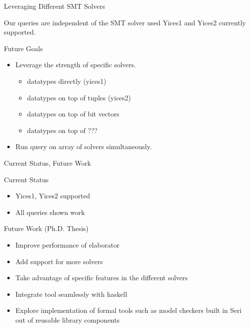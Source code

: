 \documentclass{beamer}
\begin{document}
\begin{frame}{Leveraging Different SMT Solvers}
\begin{block}{Our queries are independent of the SMT solver used}
Yices1 and Yices2 currently supported.
\end{block}
\begin{block}{Future Goals}
    \begin{itemize}
        \item Leverage the strength of specific solvers.
        \begin{itemize}
            \item datatypes directly (yices1)
            \item datatypes on top of tuples (yices2)
            \item datatypes on top of bit vectors
            \item datatypes on top of ???
        \end{itemize}

        \item Run query on array of solvers simultaneously.
    \end{itemize}
\end{block}
\end{frame}

\begin{frame}{Current Status, Future Work}
\begin{block}{Current Status}
    \begin{itemize}
        \item Yices1, Yices2 supported
        \item All queries shown work
    \end{itemize}
\end{block}
\begin{block}{Future Work (Ph.D. Thesis)}
    \begin{itemize}
        \item Improve performance of elaborator
        \item Add support for more solvers
        \item Take advantage of specific features in the different solvers
        \item Integrate tool seamlessly with haskell
        \item Explore implementation of formal tools such as model checkers
              built in Seri out of reusable library components
    \end{itemize}
\end{block}
\end{frame}
\end{document}
